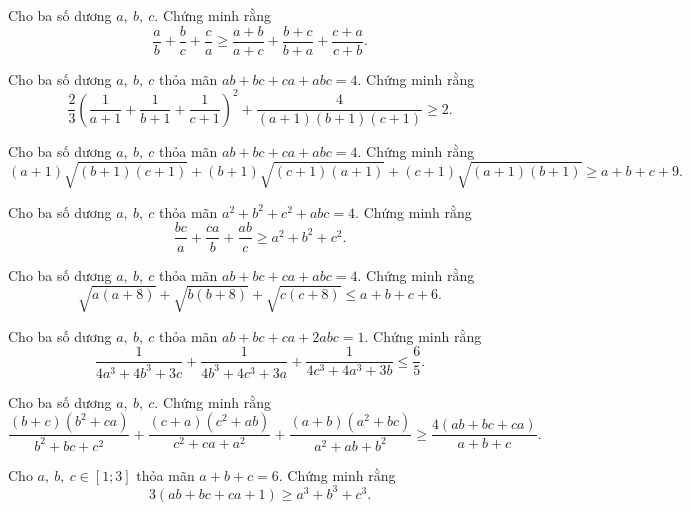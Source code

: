 {\begin{bt}
\begin{enumEX}{1}
	\end{enumEX}
\end{bt}
\begin{bt}%
	Cho ba số dương $ a,\ b,\ c $. Chứng minh rằng
	\[ 
	\dfrac{a}{b}+\dfrac{b}{c}+\dfrac{c}{a}\geq \dfrac{a+b}{a+c}+\dfrac{b+c}{b+a}+\dfrac{c+a}{c+b}.
	\]
\end{bt}
\begin{bt}%
	Cho ba số dương $ a,\ b,\ c $ thỏa mãn $ ab+bc+ca+abc=4 $. Chứng minh rằng
	\[ 
	\dfrac{2}{3}\left(\dfrac{1}{a+1}+\dfrac{1}{b+1}+\dfrac{1}{c+1}\right)^{2}+\dfrac{4}{(a+1)(b+1)(c+1)}\geq 2.
	\]
\end{bt}
\begin{bt}%
	Cho ba số dương $ a,\ b,\ c $ thỏa mãn $ ab+bc+ca+abc=4 $. Chứng minh rằng
	\[ 
	(a+1)\sqrt{(b+1)(c+1)}+(b+1)\sqrt{(c+1)(a+1)}+(c+1)\sqrt{(a+1)(b+1)}\geq a+b+c+9.
	\]
\end{bt}
\begin{bt}%
	Cho ba số dương $ a,\ b,\ c $ thỏa mãn $ a^{2}+b^{2}+c^{2}+abc=4 $. Chứng minh rằng
	\[ 
	\dfrac{bc}{a}+\dfrac{ca}{b}+\dfrac{ab}{c}\geq a^{2}+b^{2}+c^{2}.
	\]
\end{bt}
\begin{bt}%
	Cho ba số dương $ a,\ b,\ c $ thỏa mãn $ ab+bc+ca+abc=4 $. Chứng minh rằng
	\[ 
	\sqrt{a(a+8)}+\sqrt{b(b+8)}+\sqrt{c(c+8)}\leq a+b+c+6.
	\]
\end{bt}
\begin{bt}%
	Cho ba số dương $ a,\ b,\ c $ thỏa mãn $ ab+bc+ca+2abc=1 $. Chứng minh rằng
	\[ 
	\dfrac{1}{4a^{3}+4b^{3}+3c}+\dfrac{1}{4b^{3}+4c^{3}+3a}+\dfrac{1}{4c^{3}+4a^{3}+3b}\leq \dfrac{6}{5}.
	\]
\end{bt}
\begin{bt}%
	Cho ba số dương $ a,\ b,\ c $. Chứng minh rằng
	\[ 
	\dfrac{(b+c)(b^{2}+ca)}{b^{2}+bc+c^{2}}+\dfrac{(c+a)(c^{2}+ab)}{c^{2}+ca+a^{2}}+\dfrac{(a+b)(a^{2}+bc)}{a^{2}+ab+b^{2}}\geq \dfrac{4(ab+bc+ca)}{a+b+c}.
	\]
\end{bt}
\begin{bt}%
	Cho $ a,\ b,\ c\in[1;3] $ thỏa mãn $ a+b+c=6 $. Chứng minh rằng
	\[ 
	3(ab+bc+ca+1)\geq a^{3}+b^{3}+c^{3}.
	\]
\end{bt}
\begin{bt}%

\end{bt}}
